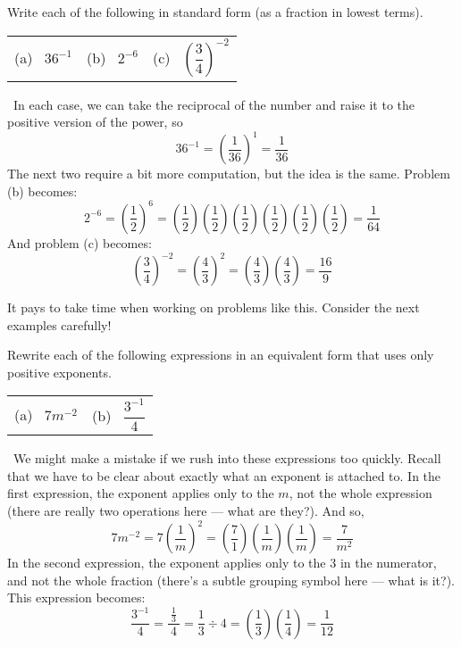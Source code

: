 \begin{boxedex}
Write each of the following in standard form (as a fraction in lowest terms).

\begin{center}
\begin{tabularx}{0.6\textwidth}{XXX}
(a)~ $36^{-1}$
&
(b)~ $2^{-6}$
&
(c)~ $\left(\dfrac{3}{4}\right)^{-2}$
\end{tabularx}
\end{center}

\exsoln\ In each case, we can take the reciprocal of the number and raise it to the positive version of the power, so \[36^{-1} = \left(\frac{1}{36}\right)^1 = \frac{1}{36}\]
The next two require a bit more computation, but the idea is the same. Problem (b) becomes:
\[2^{-6} = \left(\frac{1}{2}\right)^6 = \left(\frac{1}{2}\right)\left(\frac{1}{2}\right)\left(\frac{1}{2}\right)\left(\frac{1}{2}\right)\left(\frac{1}{2}\right)\left(\frac{1}{2}\right) = \frac{1}{64}\]
And problem (c) becomes:
\[\left(\frac{3}{4}\right)^{-2} = \left(\frac{4}{3}\right)^2 = \left(\frac{4}{3}\right)\left(\frac{4}{3}\right) = \frac{16}{9}\]
\end{boxedex}

It pays to take time when working on problems like this. Consider the next examples carefully!

\begin{boxedex}
Rewrite each of the following expressions in an equivalent form that uses only positive exponents.
\begin{center}
\begin{tabularx}{0.4\textwidth}{XX}
(a)~ $7m^{-2}$
&
(b)~ $\dfrac{3^{-1}}{~4~}$
\end{tabularx}
\end{center}

\exsoln\ We might make a mistake if we rush into these expressions too quickly. Recall that we have to be clear about exactly what an exponent is attached to. In the first expression, the exponent applies only to the $m$, not the whole expression (there are really two operations here --- what are they?). And so,
\[7m^{-2} = 7\left(\frac{1}{m}\right)^2 = \left(\frac{7}{1}\right)\left(\frac{1}{m}\right)\left(\frac{1}{m}\right) = \frac{7}{m^2}\]
In the second expression, the exponent applies only to the 3 in the numerator, and not the whole fraction (there's a subtle grouping symbol here --- what is it?). This expression becomes:
\[\dfrac{3^{-1}}{~4~} = \dfrac{\tfrac{1}{3}}{~4~} = \frac{1}{3}\div{4} = \left(\frac{1}{3}\right)\left(\frac{1}{4}\right) = \frac{1}{12}\]
\end{boxedex}

